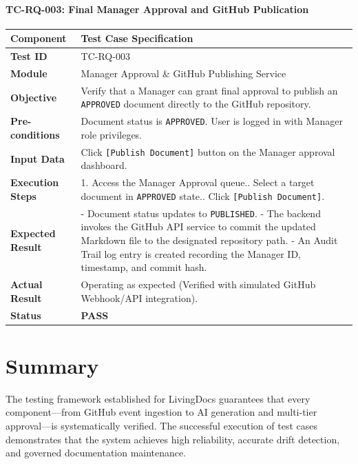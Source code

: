 \vspace{0.3cm}

\paragraph{TC-RQ-003: Final Manager Approval and GitHub Publication}

\begin{longtable}{|l|p{10.5cm}|}
    \hline
    \textbf{Component} & \textbf{Test Case Specification} \\ \hline
    \textbf{Test ID} & TC-RQ-003 \\ \hline
    \textbf{Module} & Manager Approval \& GitHub Publishing Service \\ \hline
    \textbf{Objective} & Verify that a Manager can grant final approval to publish an \texttt{APPROVED} document directly to the GitHub repository. \\ \hline
    \textbf{Pre-conditions} & Document status is \texttt{APPROVED}. User is logged in with Manager role privileges. \\ \hline
    \textbf{Input Data} & Click \texttt{[Publish Document]} button on the Manager approval dashboard. \\ \hline
    \textbf{Execution Steps} & 
    1. Access the Manager Approval queue.\newline
    2. Select a target document in \texttt{APPROVED} state.\newline
    3. Click \texttt{[Publish Document]}. \\ \hline
    \textbf{Expected Result} & 
    - Document status updates to \texttt{PUBLISHED}.\newline
    - The backend invokes the GitHub API service to commit the updated Markdown file to the designated repository path.\newline
    - An Audit Trail log entry is created recording the Manager ID, timestamp, and commit hash. \\ \hline
    \textbf{Actual Result} & Operating as expected (Verified with simulated GitHub Webhook/API integration). \\ \hline
    \textbf{Status} & \textbf{\color{green}PASS} \\ \hline
\end{longtable}

\section{Summary}
The testing framework established for LivingDocs guarantees that every component—from GitHub event ingestion to AI generation and multi-tier approval—is systematically verified. The successful execution of test cases demonstrates that the system achieves high reliability, accurate drift detection, and governed documentation maintenance.